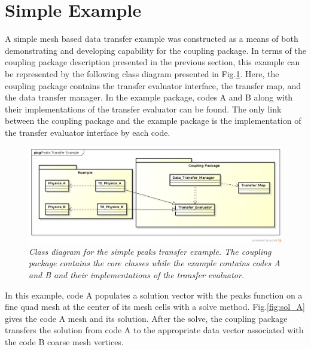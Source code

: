 \documentclass[letterpaper]{article}
\begin{document}
\section{Simple Example}
A simple mesh based data transfer example was constructed as a
means of both demonstrating and developing capability for the coupling
package. In terms of the coupling package description presented in the
previous section, this example can be represented by the following
class diagram presented in Fig.\ref{fig:example_domain}. Here, the
coupling package contains the transfer evaluator interface, the
transfer map, and the data transfer manager. In the example package,
codes A and B along with their implementations of the transfer
evaluator can be found. The only link between the coupling package and
the example package is the implementation of the transfer evaluator
interface by each code. 

\begin{figure}[htpb!]
  \begin{center}
    \includegraphics[width=6in]{images/Example_Diagram.png}
  \end{center}
  \caption{\small \sl Class diagram for the simple peaks transfer
    example. The coupling package contains the core classes while the
    example contains codes A and B and their implementations of the
    transfer evaluator.}
  \label{fig:example_domain}
\end{figure}

In this example, code A populates a solution vector with the
peaks function on a fine quad mesh at the center of its mesh cells
with a solve method. Fig.\ref{fig:sol_A} gives the code A mesh and its 
solution. After the solve, the coupling package transfers the solution
from code A to the appropriate data vector associated with the code B
coarse mesh vertices.
\end{document}
